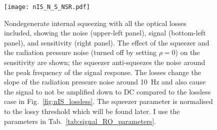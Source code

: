 \begin{figure}
	\centering
	\texttt{[image: nIS\_N\_S\_NSR.pdf]}
	\caption{Nondegenerate internal squeezing with all the optical losses included, showing the noise (upper-left panel), signal (bottom-left panel), and sensitivity (right panel). The effect of the squeezer and the radiation pressure noise (turned off by setting $\rho=0$) on the sensitivity are shown; the squeezer anti-squeezes the noise around the peak frequency of the signal response. The losses change the slope of the radiation pressure noise around 10~Hz and also cause the signal to not be amplified down to DC compared to the lossless case in Fig.~\ref{fig:nIS_lossless}. The squeezer parameter is normalised to the lossy threshold which will be found later. I use the parameters in Tab.~\ref{tab:signal_RO_parameters}.}
	\label{fig:nIS_general_sens}
\end{figure}

